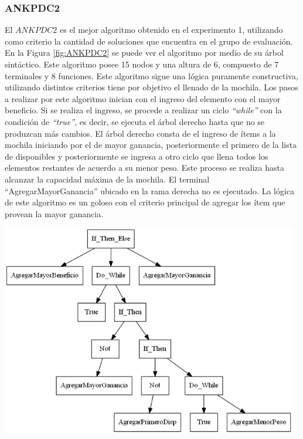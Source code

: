 \subsubsection{ANKPDC2}

El $ANKPDC2$ es el mejor algoritmo obtenido en el experimento 1, utilizando como criterio la cantidad de soluciones que encuentra en el grupo de evaluación. En la Figura \ref{fig:ANKPDC2} se puede ver el algoritmo por medio de su árbol sintáctico. Este algoritmo posee 15 nodos y una altura de 6, compuesto de 7 terminales y 8 funciones. Este algoritmo sigue una lógica puramente constructiva, utilizando distintos criterios tiene por objetivo el llenado de la mochila.
Los pasos a realizar por este algoritmo inician con el ingreso del elemento con el mayor beneficio. Si se realiza el ingreso, se procede a realizar un ciclo \textit{“while”} con la condición de \textit{“true”}, es decir, se ejecuta el árbol derecho hasta que no se produzcan más cambios. El árbol derecho consta de el ingreso de ítems a la mochila iniciando por el de mayor ganancia, posteriormente el primero de la lista de disponibles y posteriormente se ingresa a otro ciclo que llena todos los elementos restantes de acuerdo a su menor peso. Este proceso se realiza hasta alcanzar la capacidad máxima de la mochila. El terminal “AgregarMayorGanancia” ubicado en la rama derecha no es ejecutado. La lógica de este algoritmo es un goloso con el criterio principal de agregar los ítem que provean la mayor ganancia.

\begingroup
    \centering
    \includegraphics[width=13cm]{images/cap6/ANKPDC2.png}
    \label{fig:ANKPDC2}
\endgroup

